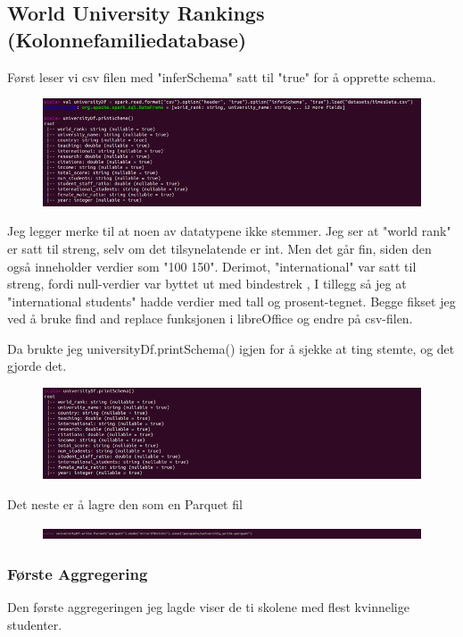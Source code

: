 \subsection{World University Rankings (Kolonnefamiliedatabase)}

Først leser vi csv filen med "inferSchema" satt til "true" for å opprette schema.
\FigureCounter
\begin{figure}
    \includegraphics[width=\textwidth]{images/milepael5/csvRead.png}
\end{figure}

Jeg legger merke til at noen av datatypene ikke stemmer. Jeg ser at "world rank" er satt til streng, selv om det tilsynelatende er int. Men det går fin, siden den også inneholder verdier som "100 150". Derimot, "international" var satt til streng, fordi null-verdier var byttet ut med bindestrek , I tillegg så jeg at "international students" hadde verdier med tall og prosent-tegnet. Begge fikset jeg ved å bruke find and replace funksjonen i libreOffice og endre på csv-filen.

Da brukte jeg universityDf.printSchema() igjen for å sjekke at ting stemte, og det gjorde det.
\FigureCounter
\begin{figure}[H]
    \includegraphics[width=\textwidth]{images/milepael5/printSchema.png}
\end{figure}

Det neste er å lagre den som en Parquet fil
\FigureCounter
\begin{figure}[H]
    \includegraphics[width=\textwidth]{images/milepael5/writeParquet.png}
\end{figure}

\subsubsection{Første Aggregering}
Den første aggregeringen jeg lagde viser de ti skolene med flest kvinnelige studenter. 

